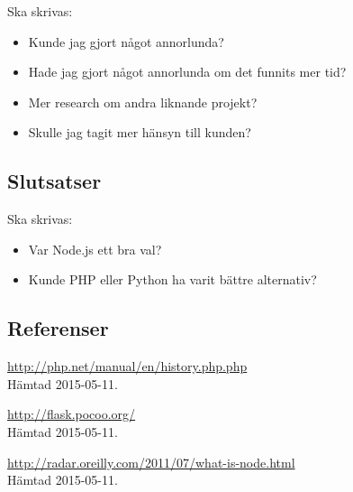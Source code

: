 Ska skrivas:
\begin{itemize}
	\item Kunde jag gjort något annorlunda?
	\item Hade jag gjort något annorlunda om det funnits mer tid?
	\item Mer research om andra liknande projekt?
	\item Skulle jag tagit mer hänsyn till kunden?
\end{itemize}


\subsection{Slutsatser}
Ska skrivas:
\begin{itemize}
	\item Var Node.js ett bra val?
	\item Kunde PHP eller Python ha varit bättre alternativ?
\end{itemize}

\subsection{Referenser}
\vspace{-9mm}
\begin{thebibliography}{9}

	\url{http://php.net/manual/en/history.php.php}\\
	Hämtad 2015-05-11.
	
	\url{http://flask.pocoo.org/}\\
	Hämtad 2015-05-11.
	
	\url{http://radar.oreilly.com/2011/07/what-is-node.html}\\
	Hämtad 2015-05-11.
	
\end{thebibliography}